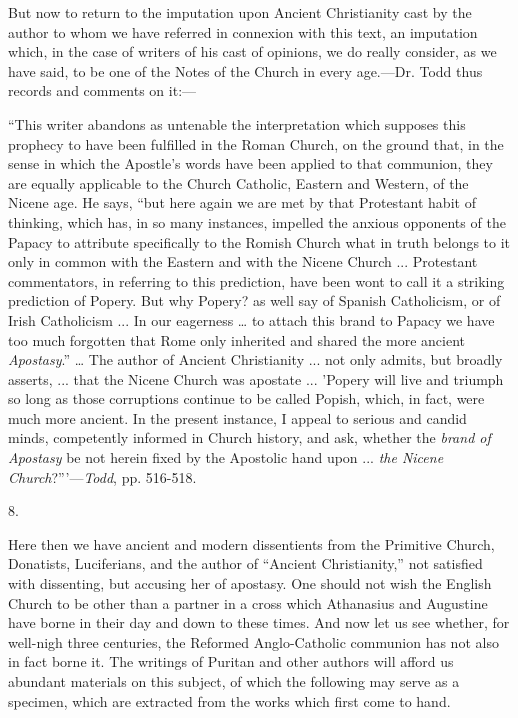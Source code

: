 But now to return to the imputation upon Ancient Christianity cast
by the author to whom we have referred in connexion with this text, an
imputation which, in the case of writers of his cast of opinions, we
do really consider, as we have said, to be one of the Notes of the
Church in every age.—Dr. Todd thus records and comments on it:—

``This writer abandons as untenable the interpretation which
supposes this prophecy to have been fulfilled in the Roman Church, on
the ground that, in the sense in which the Apostle's words have been
applied to that communion, they are equally applicable to the Church
Catholic, Eastern and Western, of the Nicene age. He says, ``but
here again we are met by that Protestant habit of thinking, which has,
in so many instances, impelled the anxious opponents of the Papacy to
attribute specifically to the Romish Church what in truth belongs to
it only in common with the Eastern and with the Nicene Church ...
Protestant commentators, in referring to this prediction, have been
wont to call it a striking prediction of Popery. But why Popery? as
well say of Spanish Catholicism, or of Irish Catholicism ... In our
eagerness … to attach this brand to Papacy we have too much
forgotten that Rome only inherited and shared the more ancient \emph{Apostasy}.''
… The author of Ancient Christianity ... not only admits, but
broadly asserts, ... that the Nicene Church was apostate ... 'Popery
will live and triumph so long as those corruptions continue
to be called Popish, which, in fact, were much
more ancient. In the present instance, I appeal to serious and candid
minds, competently informed in Church history, and ask, whether the \emph{brand
of Apostasy} be not herein fixed by the Apostolic hand upon ... \emph{the
Nicene Church}?'''—\emph{Todd}, pp. 516-518.

8.

Here then we have ancient and modern dissentients from the
Primitive Church, Donatists, Luciferians, and the author of
``Ancient Christianity,'' not satisfied with dissenting, but
accusing her of apostasy. One should not wish the English Church to be
other than a partner in a cross which Athanasius and Augustine have
borne in their day and down to these times. And now let us see
whether, for well-nigh three centuries, the Reformed Anglo-Catholic
communion has not also in fact borne it. The writings of Puritan and
other authors will afford us abundant materials on this subject, of
which the following may serve as a specimen, which are extracted from
the works which first come to hand.

